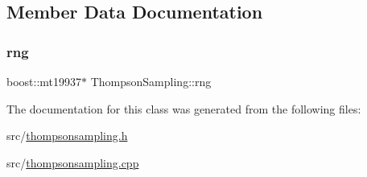 \subsection{Member Data Documentation}
\mbox{\label{class_thompson_sampling_a1b66efa9bb0912df92975147f8923216}} 
\subsubsection{\texorpdfstring{rng}{rng}}
{\footnotesize\ttfamily boost\+::mt19937$\ast$ Thompson\+Sampling\+::rng\hspace{0.3cm}{\ttfamily [protected]}}



The documentation for this class was generated from the following files\+:\begin{DoxyCompactItemize}
\item 
src/\mbox{\hyperlink{thompsonsampling_8h}{thompsonsampling.\+h}}\item 
src/\mbox{\hyperlink{thompsonsampling_8cpp}{thompsonsampling.\+cpp}}\end{DoxyCompactItemize}
